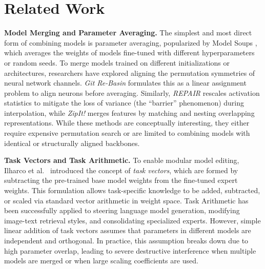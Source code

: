 \section{Related Work}
\label{submission:related}

\textbf{Model Merging and Parameter Averaging.}
The simplest and most direct form of combining models is parameter averaging, popularized by Model Soups \cite{wortsman2022robust}, which averages the weights of models fine-tuned with different hyperparameters or random seeds.
To merge models trained on different initializations or architectures, researchers have explored aligning the permutation symmetries of neural network channels.
\emph{Git Re-Basin} \cite{ainsworth2022git} formulates this as a linear assignment problem to align neurons before averaging.
Similarly, \emph{REPAIR} \cite{jordan2022repair} rescales activation statistics to mitigate the loss of variance (the ``barrier'' phenomenon) during interpolation, while \emph{ZipIt!} \cite{stoica2023zipit} merges features by matching and nesting overlapping representations.
While these methods are conceptually interesting, they either require expensive permutation search or are limited to combining models with identical or structurally aligned backbones.

\textbf{Task Vectors and Task Arithmetic.}
To enable modular model editing, Ilharco et al.~\cite{ilharco2022editing} introduced the concept of \emph{task vectors}, which are formed by subtracting the pre-trained base model weights from the fine-tuned expert weights.
This formulation allows task-specific knowledge to be added, subtracted, or scaled via standard vector arithmetic in weight space.
Task Arithmetic has been successfully applied to steering language model generation, modifying image-text retrieval styles, and consolidating specialized experts.
However, simple linear addition of task vectors assumes that parameters in different models are independent and orthogonal.
In practice, this assumption breaks down due to high parameter overlap, leading to severe destructive interference when multiple models are merged or when large scaling coefficients are used.

